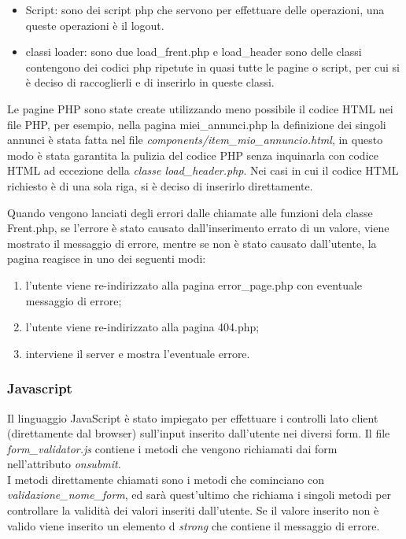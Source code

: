 \documentclass[1_relazione.tex]{subfiles}
\begin{document}
\begin{itemize}
    \item  Script: sono dei script php che servono per effettuare delle operazioni, una queste operazioni \`{e} il logout.
    \item classi loader: sono due load\_frent.php e load\_header sono delle classi contengono dei codici php ripetute in quasi tutte le pagine o script, per cui si \`{e} deciso di raccoglierli e di inserirlo in queste classi.
\end{itemize}

Le pagine PHP sono state create utilizzando meno possibile il codice HTML nei file PHP, per esempio, nella pagina miei\_annunci.php la definizione dei singoli annunci \`{e} stata fatta nel file \textit{components/item\_mio\_annuncio.html}, in questo modo \`{e} stata garantita la pulizia del codice PHP senza inquinarla con codice HTML ad eccezione della \textit{classe load\_header.php}. Nei casi in cui il codice HTML richiesto \`{e} di una sola riga, si \`{e} deciso di inserirlo direttamente.

Quando vengono lanciati degli errori dalle chiamate alle funzioni dela classe Frent.php, se l'errore \`{e} stato causato dall'inserimento errato di un valore, viene mostrato il messaggio di errore, mentre se non \`{e} stato causato dall'utente, la pagina reagisce in uno dei seguenti modi:
\begin{enumerate}
    \item l'utente viene re-indirizzato alla pagina error\_page.php con eventuale messaggio di errore;
    \item l'utente viene re-indirizzato alla pagina 404.php;
    \item interviene il server e mostra l'eventuale errore. 
\end{enumerate}

\subsubsection{Javascript}
Il linguaggio JavaScript \`{e} stato impiegato per effettuare i controlli lato client (direttamente dal browser) sull'input inserito dall'utente nei diversi form.
Il file \textit{form\_validator.js} contiene i metodi che vengono richiamati dai form nell'attributo \textit{onsubmit}.\\
I metodi direttamente chiamati sono i metodi che cominciano con \textit{validazione\_nome\_form}, ed sar\`{a} quest'ultimo che richiama i singoli metodi per controllare la validit\`{a} dei valori inseriti dall'utente.
Se il valore inserito non \`{e} valido viene inserito un elemento d \textit{strong} che contiene il messaggio di errore.
\end{document}
